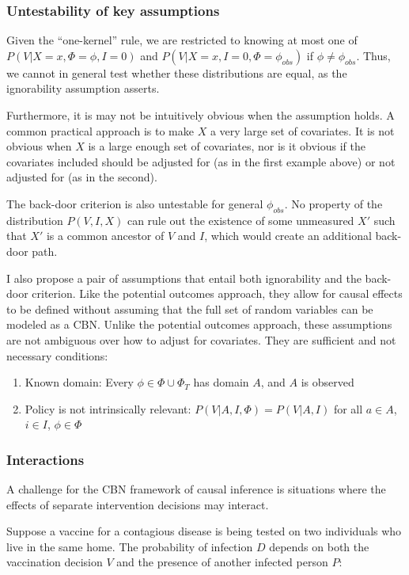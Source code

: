 \subsubsection{Untestability of key assumptions}

Given the ``one-kernel'' rule, we are restricted to knowing at most one of $P(V|X=x,\Phi=\phi,I=0)$ and $P(V|X=x, I=0, \Phi=\phi_{obs})$ if $\phi\neq \phi_{obs}$. Thus, we cannot in general test whether these distributions are equal, as the ignorability assumption asserts. 

Furthermore, it is may not be intuitively obvious when the assumption holds. A common practical approach is to make $X$ a very large set of covariates. It is not obvious when $X$ is a large enough set of covariates, nor is it obvious if the covariates included should be adjusted for (as in the first example above) or not adjusted for (as in the second).

The back-door criterion is also untestable for general $\phi_{obs}$. No property of the distribution $P(V,I,X)$ can rule out the existence of some unmeasured $X'$ such that $X'$ is a common ancestor of $V$ and $I$, which would create an additional back-door path.

I also propose a pair of assumptions that entail both ignorability and the back-door criterion. Like the potential outcomes approach, they allow for causal effects to be defined without assuming that the full set of random variables can be modeled as a CBN. Unlike the potential outcomes approach, these assumptions are not ambiguous over how to adjust for covariates. They are sufficient and not necessary conditions:

\begin{enumerate}
    \item Known domain: Every $\phi\in\Phi\cup \Phi_T$ has domain $A$, and $A$ is observed
    \item Policy is not intrinsically relevant: $P(V|A,I,\Phi)=P(V|A,I)$ for all $a\in A$, $i\in I$, $\phi\in \Phi$
\end{enumerate}

\subsubsection{Interactions}\label{sssec:SUTVA}

A challenge for the CBN framework of causal inference is situations where the effects of separate intervention decisions may interact.

Suppose a vaccine for a contagious disease is being tested on two individuals who live in the same home. The probability of infection $D$ depends on both the vaccination decision $V$ and the presence of another infected person $P$:


